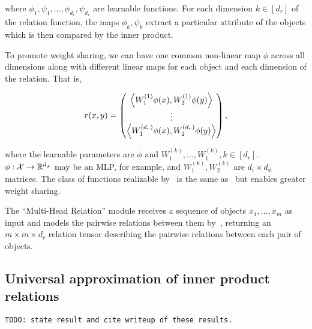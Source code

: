 \noindent where $\phi_1, \psi_1, \ldots, \phi_{d_r}, \psi_{d_r}$ are learnable functions. For each dimension $k \in [d_r]$ of the relation function, the maps $\phi_k, \psi_k$ extract a particular attribute of the objects which is then compared by the inner product.

To promote weight sharing, we can have one common non-linear map $\phi$ across all dimensions along with different linear maps for each object and each dimension of the relation. That is,

\begin{equation}\label{eq:relation_function_lin_proj}
    r(x, y) = \begin{pmatrix}
        \left \langle W_1^{(1)}\phi(x), W_2^{(1)}\phi(y) \right\rangle \\
        \vdots \\
        \left \langle W_1^{(d_r)}\phi(x), W_2^{(d_r)}\phi(y) \right\rangle \\
    \end{pmatrix},
\end{equation}

\noindent where the learnable parameters are $\phi$ and $W_1^{(k)}, \ldots, W_1^{(k)}, k \in [d_r]$. $\phi: {\mathcal{X}} \to \mathbb{R}^{d_\phi}$ may be an MLP, for example, and $W_1^{(k)}, W_2^{(k)}$ are $d_i \times d_\phi$ matrices. The class of functions realizable by~ is the same as~ but enables greater weight sharing.

The ``Multi-Head Relation'' module receives a sequence of objects $x_1, \ldots, x_m$ as input and models the pairwise relations between them by~, returning an $m \times m \times d_r$ relation tensor describing the pairwise relations between each pair of objects.

\subsection{Universal approximation of inner product relations}

\texttt{TODO: state result and cite writeup of these results.}